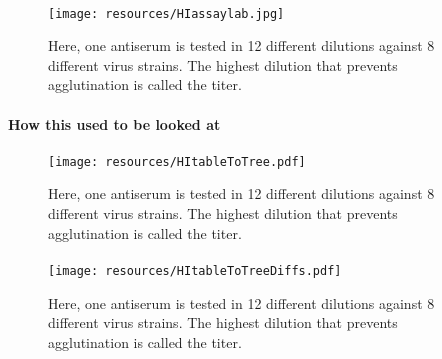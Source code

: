 \documentclass{beamer}
\begin{document}
\begin{darkframes}
    \begin{frame}{\subsecname}
      \framesubtitle{}
      \begin{figure}
        \texttt{[image: resources/HIassaylab.jpg]}
        \caption{\footnotesize Here, one antiserum is tested in 12 different dilutions against 8 different virus strains. The highest dilution that prevents agglutination is called the titer.}
      \end{figure}
    \end{frame}

    \begin{frame}{\subsecname}
      \framesubtitle{How this used to be looked at}
    \end{frame}

    \begin{frame}{\subsecname}
      \framesubtitle{}
      \begin{figure}
        \texttt{[image: resources/HItableToTree.pdf]}
        \caption{\footnotesize Here, one antiserum is tested in 12 different dilutions against 8 different virus strains. The highest dilution that prevents agglutination is called the titer.}
      \end{figure}
    \end{frame}

    \begin{frame}{\subsecname}
      \framesubtitle{}
      \begin{figure}
        \texttt{[image: resources/HItableToTreeDiffs.pdf]}
        \caption{\footnotesize Here, one antiserum is tested in 12 different dilutions against 8 different virus strains. The highest dilution that prevents agglutination is called the titer.}
      \end{figure}
    \end{frame}


\end{darkframes}
\end{document}
